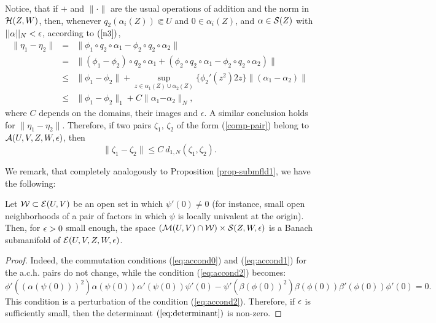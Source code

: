 Notice, that if $+$ and $\| \cdot \|$ are the usual operations of addition and the norm in $\mathcal{H}(Z,W)$, then, whenever $q_2(\alpha_i(Z)) \Subset U$  and $0 \in \alpha_i(Z)$,  and  $\alpha \in \mathcal{S}(Z)$ with $||\alpha||_N<\epsilon$,  according to $(\ref{n3})$,
\begin{eqnarray}
\nonumber \|\eta_1 -\eta_2 \| & = & \| \phi_1 \circ q_2 \circ \alpha_1 -  \phi_2 \circ q_2 \circ \alpha_2   \| \\
\nonumber &=&   \| (\phi_1-\phi_2) \circ q_2 \circ \alpha_1 +(\phi_2 \circ q_2 \circ \alpha_1 - \phi_2 \circ q_2 \circ \alpha_2)   \|  \\
\nonumber &\le&  \| \phi_1-\phi_2 \|+  \sup_{z \in \alpha_1(Z) \cup \alpha_2(Z)}\{\phi_2'(z^2) 2 z    \}   \|(\alpha_1 -  \alpha_2)   \| \\
\nonumber &\le&   \| \phi_1-\phi_2 \|_1+  C \| \alpha_1 \pmb{-} \alpha_2\|_N,
\end{eqnarray}
where $C$ depends on the domains, their images and $\epsilon$. A similar conclusion holds for  $\|\eta_1 -\eta_2 \|$. Therefore, if two pairs $\zeta_1$, $\zeta_2$ of the form (\ref{comp-pair}) belong to $\mathcal{A}(U,V,Z,W,\epsilon)$, then
\begin{equation} \label{eq:normsbounds}
\|\zeta_1-\zeta_2 \| \le C \ d_{1,N}(\zeta_1,\zeta_2).
\end{equation}

We remark, that completely analogously to Proposition \ref{prop-submfld1}, we have the following:
\begin{prop}
\label{prop-submfld2} Let $\mathcal{W}\subset \mathcal{E}(U,V)$  be an open set in which $\psi'(0)\neq 0$ (for instance, small open neighborhoods
 of a pair of factors in which $\psi$ is locally univalent at the origin).
Then, for $\epsilon>0$ small enough, the  space  $(\mathcal{M}(U,V)\cap \mathcal{W})\times\mathcal{S}(Z,W,\epsilon)$ is a Banach submanifold of $\mathcal{E}(U,V,Z,W,\epsilon)$.
\end{prop}
\begin{proof}
Indeed,
the commutation conditions (\ref{eq:accond0}) and (\ref{eq:accond1}) for the a.c.h. pairs do not change, while the condition (\ref{eq:accond2}) becomes:
$$\phi'\left(\left(\alpha(\psi(0))\right)^2 \right)  \alpha(\psi (0))  \alpha'(\psi(0)) \psi'(0)-\psi'(\beta(\phi(0))^2)  \beta(\phi (0)) \beta'(\phi(0))  \phi'(0)=0.$$
This condition is a perturbation of the condition (\ref{eq:accond2}). Therefore, if $\epsilon$ is sufficiently small, then the determinant $(\ref{eq:determinant})$ is non-zero.
\end{proof}


